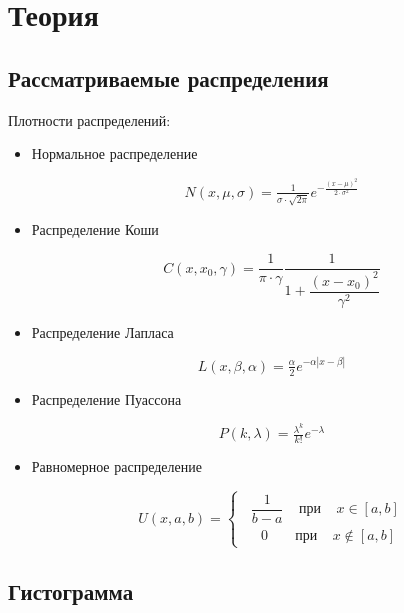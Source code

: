 \section{Теория}

\subsection{Рассматриваемые распределения}

Плотности распределений:

\begin{itemize}
	\item Нормальное распределение
	
	\begin{equation}
		N(x, \mu, \sigma) = \tfrac{1}{\sigma\cdot \sqrt{2\pi}}e^{-\tfrac{(x - \mu)^2}{2\cdot \sigma^2}}
	\end{equation}

	\item Распределение Коши
	
	\begin{equation}
		C(x, x_0, \gamma) = \dfrac{1}{\pi\cdot \gamma}\dfrac{1}{1 + \dfrac{(x - x_0)^2}{\gamma^2}}
	\end{equation}

	\item Распределение Лапласа
	
	\begin{equation}
		L(x, \beta, \alpha) =\tfrac{\alpha}{2}e^{-\alpha|x - \beta|}
	\end{equation}

	\item Распределение Пуассона
	
	\begin{equation}
		P(k, \lambda) = \tfrac{\lambda^k}{k!}e^{-\lambda}
	\end{equation}

	\item Равномерное распределение
	
	\begin{equation}
		U(x, a, b) =
		\begin{cases} 
			\;\; \dfrac{1}{b - a} \;\;\;\; \text{при} \;\;\;\; x \in [a, b]\\
			\,\,\,\:\;\; 0 \;\;\;\;\;\;\; \text{при} \;\;\;\; x \not\in [a, b]
		\end{cases}
	\end{equation}
\end{itemize}

\subsection{Гистограмма}

